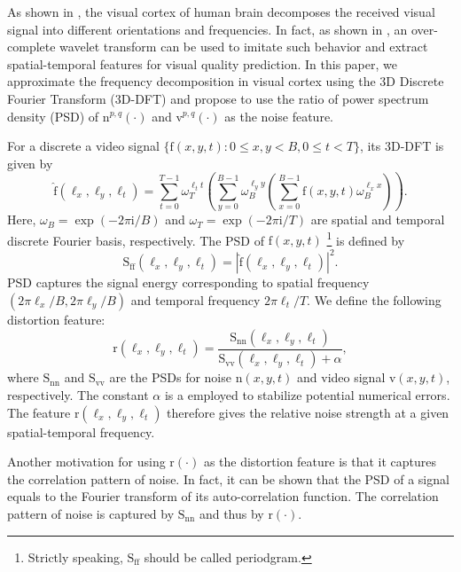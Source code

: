 \documentclass{sig-alternate}
\begin{document}
As shown in \cite{Bov2013,Dau1985,OlsFie2005}, the visual cortex of human brain decomposes the received visual signal into different orientations and frequencies. In fact, as shown in \cite{Gir1989,MOVIE}, an over-complete wavelet transform can be used to imitate such behavior and extract spatial-temporal features for visual quality prediction. In this paper, we approximate the frequency decomposition in visual cortex using the 3D Discrete Fourier Transform (3D-DFT) and propose to use the ratio of power spectrum density (PSD) of $\mathrm{n}^{p,q}(\cdot)$ and $\mathrm{v}^{p,q}(\cdot)$ as the noise feature. 

For a discrete a video signal $\{\mathrm{f}(x,y,t):0\leq x,y<B, 0\leq t<T\}$, its 3D-DFT is given by
\begin{equation*}
\label{eq:dft}
\mathrm{\hat f}(\ell_x,\ell_y,\ell_t)=\sum_{t=0}^{T-1}\omega_T^{\ell_t t}\left(\sum_{y=0}^{B-1}\omega_B^{\ell_y y}\left(\sum_{x=0}^{B-1}\mathrm{f}(x,y,t)\omega_B^{\ell_x x}\right)\right).
\end{equation*}
Here, $\omega_B=\exp(-2\pi\mathrm{i}/B)$ and $\omega_T=\exp(-2\pi\mathrm{i}/T)$ are spatial and temporal discrete Fourier basis, respectively. The PSD of $\mathrm{f}(x,y,t)$ \footnote{Strictly speaking, $\mathrm{S_{ff}}$ should be called periodgram.} is defined by
\begin{equation}
\label{eq:psd}
\mathrm{S_{ff}}(\ell_x,\ell_y,\ell_t) = |\mathrm{\hat f}(\ell_x,\ell_y,\ell_t)|^2.
\end{equation}
PSD captures the signal energy corresponding to spatial frequency $(2\pi\ell_x/B,2\pi\ell_y/B)$ and temporal frequency $2\pi\ell_t/T$. We define the following distortion feature:
\begin{equation}
\label{eq:feature}
\mathrm{r}(\ell_x,\ell_y,\ell_t)=\frac{\mathrm{S_{nn}}(\ell_x,\ell_y,\ell_t)}{\mathrm{S_{vv}}(\ell_x,\ell_y,\ell_t) + \alpha},
\end{equation}
where $\mathrm{S_{nn}}$ and $\mathrm{S_{vv}}$ are the PSDs for noise $\mathrm{n}(x,y,t)$ and video signal $\mathrm{v}(x,y,t)$, respectively. The constant $\alpha$ is a employed to stabilize potential numerical errors. The feature $\mathrm{r}(\ell_x,\ell_y,\ell_t)$ therefore gives the relative noise strength at a given spatial-temporal frequency.  

Another motivation for using $\mathrm{r}(\cdot)$ as the distortion feature is that it captures the correlation pattern of noise. In fact, it can be shown that the PSD of a signal equals to the Fourier transform of its auto-correlation function. The correlation pattern of noise is captured by $\mathrm{S_{nn}}$ and thus by $\mathrm{r}(\cdot)$. 
\end{document}
